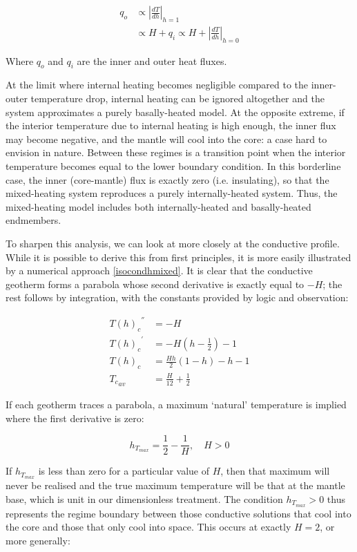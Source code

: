 \documentclass[a4paper,11pt,oneside]{book}
\begin{document}
\begin{align*}
{q}_{o} &\propto {\left| \frac{dT}{dh} \right|}_{h=1} \\
&\propto H + {q}_{i} \propto H + {\left| \frac{dT}{dh} \right|}_{h=0}
\end{align*}

Where ${q}_{o}$ and ${q}_{i}$ are the inner and outer heat fluxes.

At the limit where internal heating becomes negligible compared to the inner-outer temperature drop, internal heating can be ignored altogether and the system approximates a purely basally-heated model. At the opposite extreme, if the interior temperature due to internal heating is high enough, the inner flux may become negative, and the mantle will cool into the core: a case hard to envision in nature. Between these regimes is a transition point when the interior temperature becomes equal to the lower boundary condition. In this borderline case, the inner (core-mantle) flux is exactly zero (i.e. insulating), so that the mixed-heating system reproduces a purely internally-heated system. Thus, the mixed-heating model includes both internally-heated and basally-heated endmembers.

To sharpen this analysis, we can look at more closely at the conductive profile. While it is possible to derive this from first principles, it is more easily illustrated by a numerical approach \ref{isocondhmixed}. It is clear that the conductive geotherm forms a parabola whose second derivative is exactly equal to $-H$; the rest follows by integration, with the constants provided by logic and observation:

\begin{align*}
{{T(h)}_{c}}^{''} &= -H \\
{{T(h)}_{c}}^{'} &= -H \left( h - \frac{1}{2} \right) - 1 \\
{T(h)}_{c} &= \frac{Hh}{2} \left( 1 - h \right) - h - 1 \\
{{T}_{c}}_{av} &= \frac{H}{12} + \frac{1}{2}
\end{align*}

If each geotherm traces a parabola, a maximum `natural' temperature is implied where the first derivative is zero:

\begin{equation}
h_{T_{max}} = \frac{1}{2} - \frac{1}{H}, \quad H > 0
\end{equation}

If $h_{T_{max}}$ is less than zero for a particular value of $H$, then that maximum will never be realised and the true maximum temperature will be that at the mantle base, which is unit in our dimensionless treatment. The condition $h_{T_{max}} > 0$ thus represents the regime boundary between those conductive solutions that cool into the core and those that only cool into space. This occurs at exactly $H = 2$, or more generally:
\end{document}
